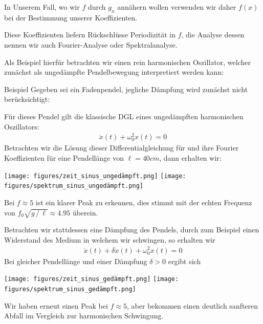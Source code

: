 In Unserem Fall, wo wir $f$ durch $g_n$ annähern wollen verwenden wir daher $f(x)$ bei der Bestimmung unserer 
Koeffizienten.

Diese Koeffizienten liefern Rückschlüsse Periodizität in $f$, die Analyse dessen nennen wir auch Fourier-Analyse 
oder Spektralanalyse. 

Als Beispiel hierfür betrachten wir einen rein harmonischen Oszillator, welcher zunächst als ungedämpfte Pendelbewegung 
interpretiert werden kann:

\begin{colboxBreakable}{Beispiel}
  Gegeben sei ein Fadenpendel, jegliche Dämpfung wird zunächst nicht berücksichtigt:
  \begin{center}
    
  \end{center}
  Für dieses Pendel gilt die klassische DGL eines ungedämpften harmonischen Oszillators:
    \begin{align*}
      \ddot{x}(t) + \omega_0^2 x(t) = 0
      \tag{1}\label{eq:PendelDGL1}
    \end{align*}
  Betrachten wir die Lösung dieser Differentialgleichung für und ihre Fourier Koeffizienten für eine Pendellänge von
  $\ell=40cm$, dann erhalten wir:
  
  \begin{center}
    \texttt{[image: figures/zeit\_sinus\_ungedämpft.png]}
    \hfill
    \texttt{[image: figures/spektrum\_sinus\_ungedämpft.png]}
  \end{center}

  Bei $f\approx 5$ ist ein klarer Peak zu erkennen, dies stimmt mit der echten Frequenz von 
  $f_0\sqrt{g\,/\,\ell}\approx 4.95$ überein.

  Betrachten wir stattdessen eine Dämpfung des Pendels, durch zum Beispiel einen Widerstand des Medium in welchem wir 
  schwingen, so erhalten wir 
    \begin{align*}
      \ddot{x}(t) + \delta\dot{x}(t)+ \omega_0^2 x(t) = 0
      \tag{2}\label{eq:PendelDGL2}
    \end{align*}
    Bei gleicher Pendellänge und einer Dämpfung $\delta>0$ ergibt sich 

    \begin{center}
      \texttt{[image: figures/zeit\_sinus\_gedämpft.png]}
      \hfill
      \texttt{[image: figures/spektrum\_sinus\_gedämpft.png]}
    \end{center}

    Wir haben erneut einen Peak bei $f\approx 5$, aber bekommen einen deutlich sanfteren Abfall im Vergleich zur
    harmonischen Schwingung.
\end{colboxBreakable}

